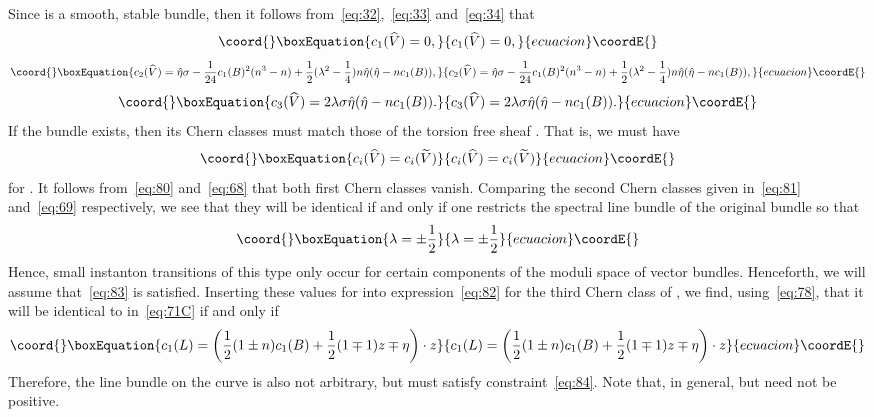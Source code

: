\documentclass[a4paper,12pt]{article}
\numberwithin{equation}{section}
\def\cN{{\mathcal N}}
\theoremstyle{plain}
\begin{document}
Since \coordHE{} is a smooth, stable \coordHE{} bundle, 
then it follows from~\eqref{eq:32},~\eqref{eq:33} and~\eqref{eq:34} that
\begin{equation}\coord{}\boxEquation{
c_{1}(\widehat{V})=0,
\label{eq:80}
}{
c_{1}(\widehat{V})=0,
}{ecuacion}\coordE{}\end{equation}
\begin{equation}\coord{}\boxEquation{
c_2(\widehat{V})=\hat{\eta}\sigma-\frac{1}{24}c_1(B)^2(n^3-n)
+\frac{1}{2}(\lambda^2-\frac{1}{4})n\hat{\eta}(\hat{\eta}-nc_1(B)), 
\label{eq:81}
}{
c_2(\widehat{V})=\hat{\eta}\sigma-\frac{1}{24}c_1(B)^2(n^3-n)
+\frac{1}{2}(\lambda^2-\frac{1}{4})n\hat{\eta}(\hat{\eta}-nc_1(B)), 
}{ecuacion}\coordE{}\end{equation}
\begin{equation}\coord{}\boxEquation{
c_3(\widehat{V})= 2\lambda \sigma \hat{\eta}(\hat{\eta}-nc_1(B)). 
\label{eq:82} 
}{
c_3(\widehat{V})= 2\lambda \sigma \hat{\eta}(\hat{\eta}-nc_1(B)). 
}{ecuacion}\coordE{}\end{equation}
If the bundle \coordHE{} exists, then its Chern classes must match
those of the 
torsion free sheaf \coordHE{}. That is, we must have
\begin{equation}\coord{}\boxEquation{
c_{i}(\widehat{V})=c_{i}(\widetilde{V})
\label{eq:82A}
}{
c_{i}(\widehat{V})=c_{i}(\widetilde{V})
}{ecuacion}\coordE{}\end{equation}
for \coordHE{}. It follows from~\eqref{eq:80}
and~\eqref{eq:68} that both first Chern classes vanish. Comparing the second
Chern classes given in~\eqref{eq:81} and~\eqref{eq:69} respectively, 
we see that they will be identical if and only if one restricts the spectral
line bundle \myHighlight{$\cN$}\coordHE{} of the original 
bundle \coordHE{} so that
\begin{equation}\coord{}\boxEquation{
\lambda=\pm\frac{1}{2}
\label{eq:83}
}{
\lambda=\pm\frac{1}{2}
}{ecuacion}\coordE{}\end{equation}
Hence, small instanton transitions of this type only occur for certain
components of the moduli space of 
\coordHE{} vector bundles. Henceforth, we will assume
that~\eqref{eq:83} is satisfied. Inserting these values for \myHighlight{$\lambda$}\coordHE{} into 
expression~\eqref{eq:82} for the third Chern class of \coordHE{}, we find,
using~\eqref{eq:78}, that it will be identical to \coordHE{}
in~\eqref{eq:71C} if and only if
\begin{equation}\coord{}\boxEquation{
c_{1}(L)=\left(\frac{1}{2}(1\pm n)c_{1}(B)+\frac{1}{2}(1\mp 1)z 
\mp\eta\right) \cdot z 
\label{eq:84}
}{
c_{1}(L)=\left(\frac{1}{2}(1\pm n)c_{1}(B)+\frac{1}{2}(1\mp 1)z 
\mp\eta\right) \cdot z 
}{ecuacion}\coordE{}\end{equation}
Therefore, the line bundle \coordHE{} on the
 curve \coordHE{} is also not arbitrary, but must
satisfy constraint~\eqref{eq:84}. Note that, in general, \coordHE{} but need not be positive.
\end{document}
